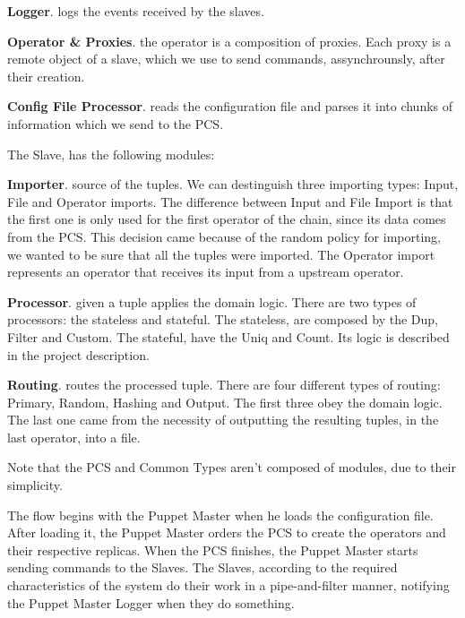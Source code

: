 \documentclass[times, 10pt,twocolumn]{article}
\begin{document}
\textbf{Logger}. logs the events received by the slaves.

\textbf{Operator \& Proxies}. the operator is a composition of proxies. Each proxy is a remote object of a slave, which we use to send commands, assynchrounsly, after their creation.

\textbf{Config File Processor}. reads the configuration file and parses it into chunks of information which we send to the PCS.

The Slave, has the following modules:

\textbf{Importer}. source of the tuples. We can destinguish three importing types: Input, File and Operator imports. The difference between Input and File Import is that the first one is only used for the first operator of the chain, since its data comes from the PCS. This decision came because of the random policy for importing, we wanted to be sure that all the tuples were imported. The Operator import represents an operator that receives its input from a upstream operator.

\textbf{Processor}. given a tuple applies the domain logic. There are two types of processors: the stateless and stateful. The stateless, are composed by the Dup, Filter and Custom. The stateful, have the Uniq and Count. Its logic is described in the project description.

\textbf{Routing}. routes the processed tuple. There are four different types of routing: Primary, Random, Hashing and Output. The first three obey the domain logic. The last one came from the necessity of outputting the resulting tuples, in the last operator, into a file. 

Note that the PCS and Common Types aren't composed of modules, due to their simplicity.



The flow begins with the Puppet Master when he loads the configuration file. After loading it, the Puppet Master orders the PCS to create the operators and their respective replicas. When the PCS finishes, the Puppet Master starts sending commands to the Slaves. The Slaves, according to the required characteristics of the system do their work in a pipe-and-filter manner, notifying the Puppet Master Logger when they do something.


\end{document}
